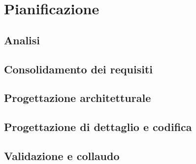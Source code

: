 \section{Pianificazione}
\subsection{Analisi}
\subsection{Consolidamento dei requisiti}%
\subsection{Progettazione architetturale}
\subsection{Progettazione di dettaglio e codifica}
\subsection{Validazione e collaudo}
